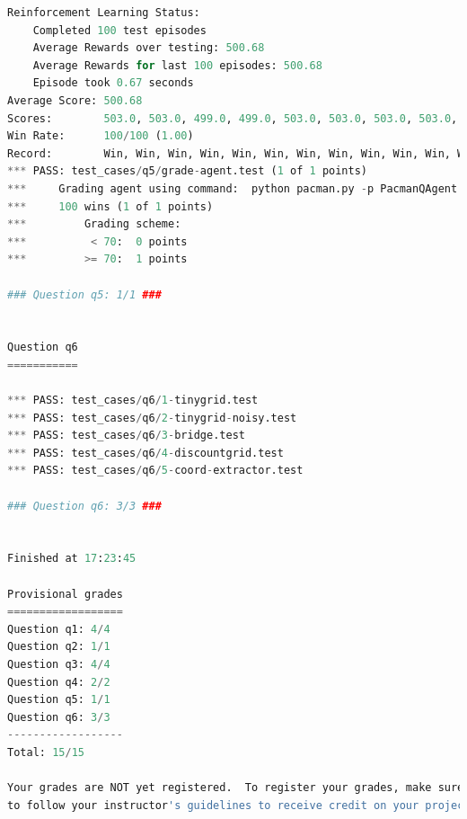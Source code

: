 \documentclass{report}
\begin{document}
\begin{lstlisting}[language=Python, caption=Autograder]
Reinforcement Learning Status:
	Completed 100 test episodes
	Average Rewards over testing: 500.68
	Average Rewards for last 100 episodes: 500.68
	Episode took 0.67 seconds
Average Score: 500.68
Scores:        503.0, 503.0, 499.0, 499.0, 503.0, 503.0, 503.0, 503.0, 495.0, 503.0, 499.0, 503.0, 503.0, 503.0, 503.0, 503.0, 495.0, 503.0, 503.0, 503.0, 503.0, 503.0, 503.0, 503.0, 499.0, 495.0, 503.0, 503.0, 495.0, 495.0, 495.0, 499.0, 499.0, 503.0, 503.0, 503.0, 503.0, 495.0, 499.0, 503.0, 495.0, 499.0, 503.0, 503.0, 503.0, 503.0, 499.0, 503.0, 495.0, 503.0, 503.0, 503.0, 503.0, 499.0, 503.0, 499.0, 503.0, 503.0, 499.0, 503.0, 503.0, 503.0, 503.0, 503.0, 495.0, 499.0, 503.0, 495.0, 499.0, 495.0, 495.0, 503.0, 495.0, 503.0, 499.0, 503.0, 503.0, 503.0, 495.0, 495.0, 503.0, 503.0, 499.0, 503.0, 503.0, 495.0, 499.0, 503.0, 503.0, 503.0, 499.0, 503.0, 503.0, 503.0, 499.0, 499.0, 495.0, 499.0, 499.0, 503.0
Win Rate:      100/100 (1.00)
Record:        Win, Win, Win, Win, Win, Win, Win, Win, Win, Win, Win, Win, Win, Win, Win, Win, Win, Win, Win, Win, Win, Win, Win, Win, Win, Win, Win, Win, Win, Win, Win, Win, Win, Win, Win, Win, Win, Win, Win, Win, Win, Win, Win, Win, Win, Win, Win, Win, Win, Win, Win, Win, Win, Win, Win, Win, Win, Win, Win, Win, Win, Win, Win, Win, Win, Win, Win, Win, Win, Win, Win, Win, Win, Win, Win, Win, Win, Win, Win, Win, Win, Win, Win, Win, Win, Win, Win, Win, Win, Win, Win, Win, Win, Win, Win, Win, Win, Win, Win, Win
*** PASS: test_cases/q5/grade-agent.test (1 of 1 points)
***     Grading agent using command:  python pacman.py -p PacmanQAgent -x 2000 -n 2100 -l smallGrid -q -f --fixRandomSeed
***     100 wins (1 of 1 points)
***         Grading scheme:
***          < 70:  0 points
***         >= 70:  1 points

### Question q5: 1/1 ###


Question q6
===========

*** PASS: test_cases/q6/1-tinygrid.test
*** PASS: test_cases/q6/2-tinygrid-noisy.test
*** PASS: test_cases/q6/3-bridge.test
*** PASS: test_cases/q6/4-discountgrid.test
*** PASS: test_cases/q6/5-coord-extractor.test

### Question q6: 3/3 ###


Finished at 17:23:45

Provisional grades
==================
Question q1: 4/4
Question q2: 1/1
Question q3: 4/4
Question q4: 2/2
Question q5: 1/1
Question q6: 3/3
------------------
Total: 15/15

Your grades are NOT yet registered.  To register your grades, make sure
to follow your instructor's guidelines to receive credit on your project.


\end{lstlisting}
\end{document}
